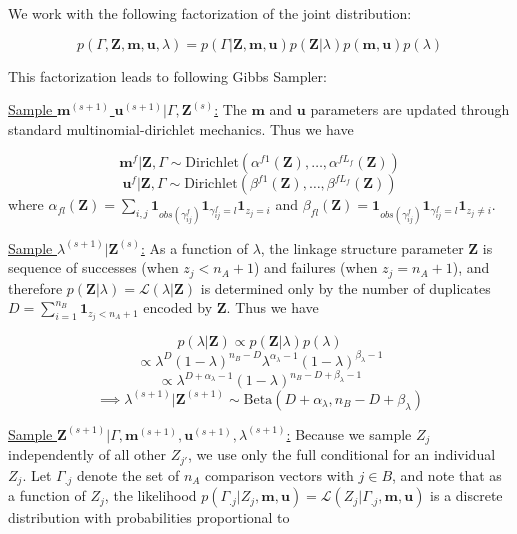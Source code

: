 \documentclass[
  12pt,
]{article}
\begin{document}
We work with the following factorization of the joint distribution:

\[p(\Gamma, \mathbf{Z}, \mathbf{m}, \mathbf{u}, \lambda) = p(\Gamma|\mathbf{Z}, \mathbf{m}, \mathbf{u}) p(\mathbf{Z} | \lambda) p(\mathbf{m}, \mathbf{u}) p(\lambda)\]

This factorization leads to following Gibbs Sampler:

\underline{Sample $\mathbf{m}^{(s+1)}$ $\mathbf{u}^{(s+1)}|\Gamma, \mathbf{Z}^{(s)}$:}
The \(\mathbf{m}\) and \(\mathbf{u}\) parameters are updated through
standard multinomial-dirichlet mechanics. Thus we have

\[\mathbf{m}^f|\mathbf{Z}, \Gamma \sim \text{Dirichlet}(\alpha^{f1}(\mathbf{Z}), \ldots, \alpha^{fL_f}(\mathbf{Z}))\]
\[\mathbf{u}^f|\mathbf{Z}, \Gamma \sim \text{Dirichlet}(\beta^{f1}(\mathbf{Z}), \ldots, \beta^{fL_f}(\mathbf{Z}))\]
where
\(\alpha_{fl}(\mathbf{Z})= \sum_{i,j} \mathbf{1}_{obs(\gamma_{ij}^f)}\mathbf{1}_{\gamma_{ij}^f = l} \mathbf{1}_{z_j = i}\)
and
\(\beta_{fl}(\mathbf{Z})= \mathbf{1}_{obs(\gamma_{ij}^f)}\mathbf{1}_{\gamma_{ij}^f = l} \mathbf{1}_{z_j \neq i}\).

\underline{Sample $\lambda^{(s+1)}|\mathbf{Z}^{(s)}$:} As a function of
\(\lambda\), the linkage structure parameter \(\mathbf{Z}\) is sequence
of successes (when \(z_j < n_A + 1\)) and failures (when
\(z_j = n_A + 1\)), and therefore
\(p(\mathbf{Z}|\lambda) = \mathcal{L}(\lambda|\mathbf{Z})\) is
determined only by the number of duplicates
\(D = \sum_{i=1}^{n_B}\mathbf{1}_{z_j < n_A + 1}\) encoded by
\(\mathbf{Z}\). Thus we have

\[p(\lambda | \mathbf{Z}) \propto p(\mathbf{Z}|\lambda)p(\lambda)\]
\[\propto \lambda^D (1-\lambda)^{n_B - D} \lambda^{\alpha_{\lambda} -1} (1-\lambda)^{\beta_{\lambda} -1}\]
\[ \propto \lambda^{D + \alpha_{\lambda} - 1} (1-\lambda)^{n_B - D + \beta_{\lambda} -1}\]
\[\implies \lambda^{(s+1)}|\mathbf{Z}^{(s+1)} \sim \text{Beta}(D + \alpha_{\lambda}, n_B - D + \beta_{\lambda})\]

\underline{Sample $\mathbf{Z}^{(s+1)}|\Gamma, \mathbf{m}^{(s+1)}, \mathbf{u}^{(s+1)}, \lambda^{(s+1)}$:}
Because we sample \(Z_j\) independently of all other \(Z_{j'}\), we use
only the full conditional for an individual \(Z_j\). Let \(\Gamma_{.j}\)
denote the set of \(n_A\) comparison vectors with \(j \in B\), and note
that as a function of \(Z_j\), the likelihood
\(p(\Gamma_{.j}|Z_j, \mathbf{m}, \mathbf{u}) = \mathcal{L}(Z_j|\Gamma_{.j}, \mathbf{m}, \mathbf{u})\)
is a discrete distribution with probabilities proportional to
\end{document}
